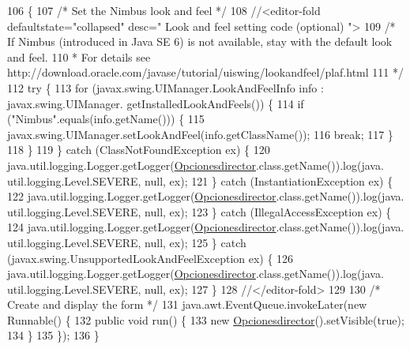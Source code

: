 \begin{DoxyCode}
106                                            \{
107         \textcolor{comment}{/* Set the Nimbus look and feel */}
108         \textcolor{comment}{//<editor-fold defaultstate="collapsed" desc=" Look and feel setting code (optional) ">}
109         \textcolor{comment}{/* If Nimbus (introduced in Java SE 6) is not available, stay with the default look and feel.}
110 \textcolor{comment}{         * For details see http://download.oracle.com/javase/tutorial/uiswing/lookandfeel/plaf.html }
111 \textcolor{comment}{         */}
112         \textcolor{keywordflow}{try} \{
113             \textcolor{keywordflow}{for} (javax.swing.UIManager.LookAndFeelInfo info : javax.swing.UIManager.
      getInstalledLookAndFeels()) \{
114                 \textcolor{keywordflow}{if} (\textcolor{stringliteral}{"Nimbus"}.equals(info.getName())) \{
115                     javax.swing.UIManager.setLookAndFeel(info.getClassName());
116                     \textcolor{keywordflow}{break};
117                 \}
118             \}
119         \} \textcolor{keywordflow}{catch} (ClassNotFoundException ex) \{
120             java.util.logging.Logger.getLogger(\mbox{\hyperlink{classsoftware_1_1_opcionesdirector_ab03556d9e7d710b395c16d98ab24896c}{Opcionesdirector}}.class.getName()).log(java.
      util.logging.Level.SEVERE, null, ex);
121         \} \textcolor{keywordflow}{catch} (InstantiationException ex) \{
122             java.util.logging.Logger.getLogger(\mbox{\hyperlink{classsoftware_1_1_opcionesdirector_ab03556d9e7d710b395c16d98ab24896c}{Opcionesdirector}}.class.getName()).log(java.
      util.logging.Level.SEVERE, null, ex);
123         \} \textcolor{keywordflow}{catch} (IllegalAccessException ex) \{
124             java.util.logging.Logger.getLogger(\mbox{\hyperlink{classsoftware_1_1_opcionesdirector_ab03556d9e7d710b395c16d98ab24896c}{Opcionesdirector}}.class.getName()).log(java.
      util.logging.Level.SEVERE, null, ex);
125         \} \textcolor{keywordflow}{catch} (javax.swing.UnsupportedLookAndFeelException ex) \{
126             java.util.logging.Logger.getLogger(\mbox{\hyperlink{classsoftware_1_1_opcionesdirector_ab03556d9e7d710b395c16d98ab24896c}{Opcionesdirector}}.class.getName()).log(java.
      util.logging.Level.SEVERE, null, ex);
127         \}
128         \textcolor{comment}{//</editor-fold>}
129 
130         \textcolor{comment}{/* Create and display the form */}
131         java.awt.EventQueue.invokeLater(\textcolor{keyword}{new} Runnable() \{
132             \textcolor{keyword}{public} \textcolor{keywordtype}{void} run() \{
133                 \textcolor{keyword}{new} \mbox{\hyperlink{classsoftware_1_1_opcionesdirector_ab03556d9e7d710b395c16d98ab24896c}{Opcionesdirector}}().setVisible(\textcolor{keyword}{true});
134             \}
135         \});
136     \}
\end{DoxyCode}


